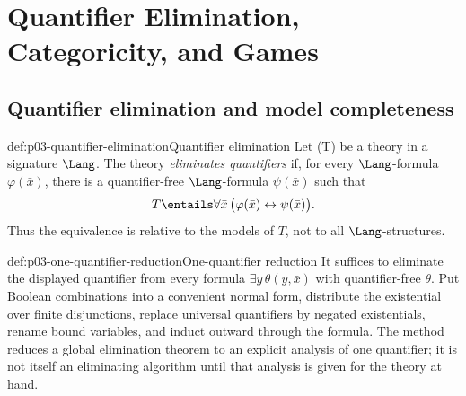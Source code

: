 
\chapter[QE, Categoricity, and Games]{Quantifier Elimination, Categoricity, and Games}
\label{sec:p03-qe-categoricity-games}

\section{Quantifier elimination and model completeness}
\label{sec:p03-quantifier-elimination}

\begin{hbdefinition}{def:p03-quantifier-elimination}{Quantifier elimination}
Let (T) be a theory in a signature \(\Lang\).  The theory \emph{eliminates
quantifiers} if, for every \(\Lang\)-formula \(\varphi(\bar x)\), there is a
quantifier-free \(\Lang\)-formula \(\psi(\bar x)\) such that
\[
  T\entails\forall\bar x\,
  \bigl(\varphi(\bar x)\leftrightarrow\psi(\bar x)\bigr).
\]
Thus the equivalence is relative to the models of \(T\), not to all
\(\Lang\)-structures.
\end{hbdefinition}

\begin{hbmethod}{def:p03-one-quantifier-reduction}{One-quantifier reduction}
It suffices to eliminate the displayed quantifier from every formula
\(\exists y\,\theta(y,\bar x)\) with quantifier-free \(\theta\).  Put Boolean
combinations into a convenient normal form, distribute the existential over
finite disjunctions, replace universal quantifiers by negated existentials,
rename bound variables, and induct outward through the formula.  The method
reduces a global elimination theorem to an explicit analysis of one
quantifier; it is not itself an eliminating algorithm until that analysis is
given for the theory at hand.
\end{hbmethod}

